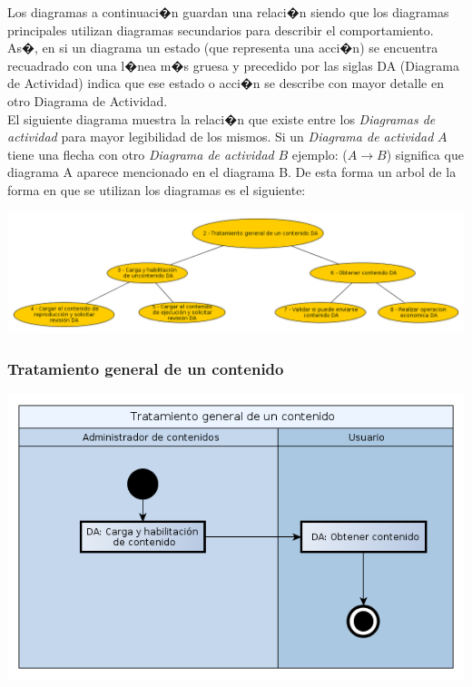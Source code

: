 \documentclass[11pt, a4paper, spanish]{article}
\begin{document}
{	Los diagramas a continuaci�n guardan una relaci�n siendo que los diagramas principales utilizan diagramas secundarios para describir el comportamiento. As�, en si un diagrama un estado (que representa una acci�n) se encuentra recuadrado con una l�nea m�s gruesa y precedido por las siglas DA (Diagrama de Actividad) indica que ese estado o acci�n se describe con mayor detalle en otro Diagrama de Actividad.\\

	El siguiente diagrama muestra la relaci�n que existe entre los \emph{Diagramas de actividad} para mayor legibilidad de los mismos. Si un \emph{Diagrama de actividad} $A$ tiene una flecha con otro \emph{Diagrama de actividad} $B$ ejemplo: ($A \rightarrow B$) significa que diagrama A aparece mencionado en el diagrama B.
De esta forma un arbol de la forma en que se utilizan los diagramas es el siguiente:\\


	\begin{center}
		\includegraphics[scale=0.37]{Diagramas/00-DiagramaDeDiagramas.png}
	\end{center}

\subsubsection{Tratamiento general de un contenido}

	\begin{center}
		\includegraphics[scale=0.37]{Diagramas/02-TratamientoGeneralDeUnContenidoDA.png}
	\end{center}

}
\end{document}
